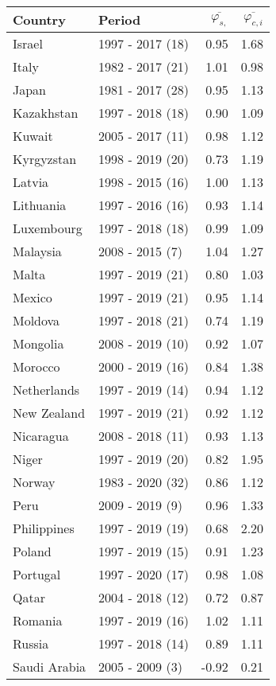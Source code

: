 \begin{table}[H]
{{\centering 
\begin{tabular}{llrr}
\toprule
Country & Period & $\overline{\varphi_{s,}}$ & $\overline{\varphi_{c,i}}$\\
\midrule
Israel & 1997 - 2017 (18) & 0.95 & 1.68\\
Italy & 1982 - 2017 (21) & 1.01 & 0.98\\
Japan & 1981 - 2017 (28) & 0.95 & 1.13\\
Kazakhstan & 1997 - 2018 (18) & 0.90 & 1.09\\
Kuwait & 2005 - 2017 (11) & 0.98 & 1.12\\
\addlinespace
Kyrgyzstan & 1998 - 2019 (20) & 0.73 & 1.19\\
Latvia & 1998 - 2015 (16) & 1.00 & 1.13\\
Lithuania & 1997 - 2016 (16) & 0.93 & 1.14\\
Luxembourg & 1997 - 2018 (18) & 0.99 & 1.09\\
Malaysia & 2008 - 2015 (7) & 1.04 & 1.27\\
\addlinespace
Malta & 1997 - 2019 (21) & 0.80 & 1.03\\
Mexico & 1997 - 2019 (21) & 0.95 & 1.14\\
Moldova & 1997 - 2018 (21) & 0.74 & 1.19\\
Mongolia & 2008 - 2019 (10) & 0.92 & 1.07\\
Morocco & 2000 - 2019 (16) & 0.84 & 1.38\\
\addlinespace
Netherlands & 1997 - 2019 (14) & 0.94 & 1.12\\
New Zealand & 1997 - 2019 (21) & 0.92 & 1.12\\
Nicaragua & 2008 - 2018 (11) & 0.93 & 1.13\\
Niger & 1997 - 2019 (20) & 0.82 & 1.95\\
Norway & 1983 - 2020 (32) & 0.86 & 1.12\\
\addlinespace
Peru & 2009 - 2019 (9) & 0.96 & 1.33\\
Philippines & 1997 - 2019 (19) & 0.68 & 2.20\\
Poland & 1997 - 2019 (15) & 0.91 & 1.23\\
Portugal & 1997 - 2020 (17) & 0.98 & 1.08\\
Qatar & 2004 - 2018 (12) & 0.72 & 0.87\\
\addlinespace
Romania & 1997 - 2019 (16) & 1.02 & 1.11\\
Russia & 1997 - 2018 (14) & 0.89 & 1.11\\
Saudi Arabia & 2005 - 2009 (3) & -0.92 & 0.21\\

\end{tabular}}}
\end{table}

